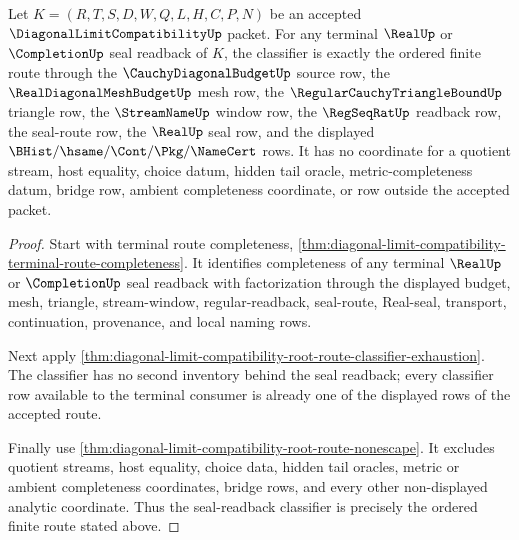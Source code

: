 \begin{theorem}
\label{thm:diagonal-limit-compatibility-root-route-seal-readback-classifier}
Let $K=(R,T,S,D,W,Q,L,H,C,P,N)$ be an accepted $\DiagonalLimitCompatibilityUp$ packet. For any terminal $\RealUp$ or $\CompletionUp$ seal readback of $K$, the classifier is exactly the ordered finite route through the $\CauchyDiagonalBudgetUp$ source row, the $\RealDiagonalMeshBudgetUp$ mesh row, the $\RegularCauchyTriangleBoundUp$ triangle row, the $\StreamNameUp$ window row, the $\RegSeqRatUp$ readback row, the seal-route row, the $\RealUp$ seal row, and the displayed $\BHist/\hsame/\Cont/\Pkg/\NameCert$ rows. It has no coordinate for a quotient stream, host equality, choice datum, hidden tail oracle, metric-completeness datum, bridge row, ambient completeness coordinate, or row outside the accepted packet.
\end{theorem}
\begin{proof}
Start with terminal route completeness, \autoref{thm:diagonal-limit-compatibility-terminal-route-completeness}. It identifies completeness of any terminal $\RealUp$ or $\CompletionUp$ seal readback with factorization through the displayed budget, mesh, triangle, stream-window, regular-readback, seal-route, Real-seal, transport, continuation, provenance, and local naming rows.

Next apply \autoref{thm:diagonal-limit-compatibility-root-route-classifier-exhaustion}. The classifier has no second inventory behind the seal readback; every classifier row available to the terminal consumer is already one of the displayed rows of the accepted route.

Finally use \autoref{thm:diagonal-limit-compatibility-root-route-nonescape}. It excludes quotient streams, host equality, choice data, hidden tail oracles, metric or ambient completeness coordinates, bridge rows, and every other non-displayed analytic coordinate. Thus the seal-readback classifier is precisely the ordered finite route stated above.
\end{proof}

